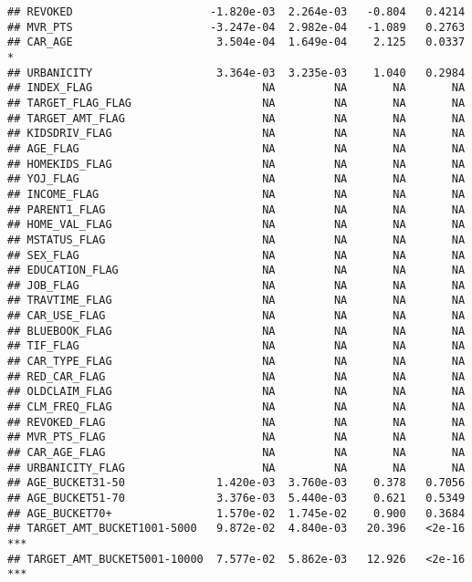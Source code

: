\documentclass[
]{article}
\begin{document}
\begin{verbatim}
## REVOKED                     -1.820e-03  2.264e-03   -0.804   0.4214    
## MVR_PTS                     -3.247e-04  2.982e-04   -1.089   0.2763    
## CAR_AGE                      3.504e-04  1.649e-04    2.125   0.0337 *  
## URBANICITY                   3.364e-03  3.235e-03    1.040   0.2984    
## INDEX_FLAG                          NA         NA       NA       NA    
## TARGET_FLAG_FLAG                    NA         NA       NA       NA    
## TARGET_AMT_FLAG                     NA         NA       NA       NA    
## KIDSDRIV_FLAG                       NA         NA       NA       NA    
## AGE_FLAG                            NA         NA       NA       NA    
## HOMEKIDS_FLAG                       NA         NA       NA       NA    
## YOJ_FLAG                            NA         NA       NA       NA    
## INCOME_FLAG                         NA         NA       NA       NA    
## PARENT1_FLAG                        NA         NA       NA       NA    
## HOME_VAL_FLAG                       NA         NA       NA       NA    
## MSTATUS_FLAG                        NA         NA       NA       NA    
## SEX_FLAG                            NA         NA       NA       NA    
## EDUCATION_FLAG                      NA         NA       NA       NA    
## JOB_FLAG                            NA         NA       NA       NA    
## TRAVTIME_FLAG                       NA         NA       NA       NA    
## CAR_USE_FLAG                        NA         NA       NA       NA    
## BLUEBOOK_FLAG                       NA         NA       NA       NA    
## TIF_FLAG                            NA         NA       NA       NA    
## CAR_TYPE_FLAG                       NA         NA       NA       NA    
## RED_CAR_FLAG                        NA         NA       NA       NA    
## OLDCLAIM_FLAG                       NA         NA       NA       NA    
## CLM_FREQ_FLAG                       NA         NA       NA       NA    
## REVOKED_FLAG                        NA         NA       NA       NA    
## MVR_PTS_FLAG                        NA         NA       NA       NA    
## CAR_AGE_FLAG                        NA         NA       NA       NA    
## URBANICITY_FLAG                     NA         NA       NA       NA    
## AGE_BUCKET31-50              1.420e-03  3.760e-03    0.378   0.7056    
## AGE_BUCKET51-70              3.376e-03  5.440e-03    0.621   0.5349    
## AGE_BUCKET70+                1.570e-02  1.745e-02    0.900   0.3684    
## TARGET_AMT_BUCKET1001-5000   9.872e-02  4.840e-03   20.396   <2e-16 ***
## TARGET_AMT_BUCKET5001-10000  7.577e-02  5.862e-03   12.926   <2e-16 ***

\end{verbatim}
\end{document}
